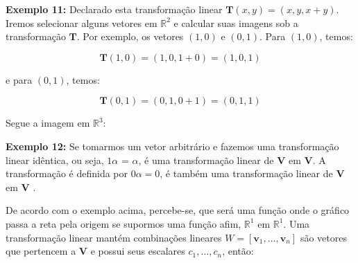 \noindent\textbf{Exemplo 11:} Declarado esta transformação linear $\mathbf{T}(x, y) = (x, y, x + y)$. Iremos selecionar alguns vetores em $\mathbb{R}^2$ e calcular suas imagens sob a transformação $\mathbf{T}$. Por exemplo, os vetores $(1, 0)$ e $(0, 1)$. Para $(1, 0)$, temos:

\begin{equation}
	\mathbf{T}(1, 0) = (1, 0, 1 +0) = (1, 0, 1)
\end{equation}

\noindent e para $(0, 1)$, temos:

\begin{equation}
	\mathbf{T}(0, 1) = (0, 1, 0 + 1) = (0, 1, 1)
\end{equation}

Segue a imagem em $\mathbb{R}^3$:


\noindent\textbf{Exemplo 12:} Se tomarmos um vetor arbitrário e fazemos uma transformação linear idêntica, ou seja, $1\alpha$ = $\alpha$, é uma transformação linear de $\mathbf{V}$ em $\mathbf{V}$. A transformação é definida por $0\alpha = 0$, é também uma transformação linear de $\mathbf{V}$ em $\mathbf{V}$ \cite{hoffman1979}.

De acordo com o exemplo acima, percebe-se, que será uma função onde o gráfico passa a reta pela origem se supormos uma função afim, $\mathbb{R}^1$ em $\mathbb{R}^1$. Uma transformação linear mantém combinações lineares $W = [\mathbf{v}_1, \ldots, \mathbf{v}_n]$ são vetores que pertencem a $\mathbf{V}$ e possui seus escalares $c_1, \ldots, c_n$, então:


